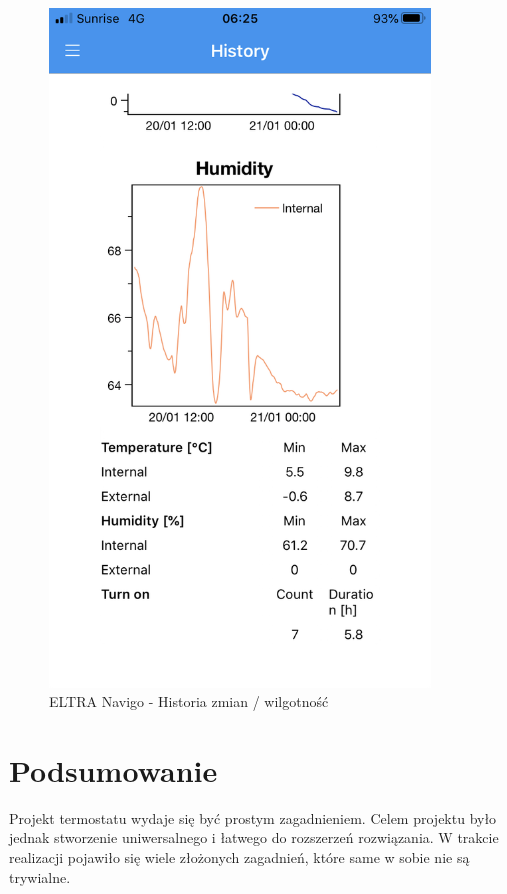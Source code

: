 \documentclass[a4paper,10pt]{article}
\begin{document}
\begin{figure}[H]
\begin{minipage}{0.45\textwidth}
        \includegraphics[width=0.9\textwidth]{navigo_history2.png} %
        \caption{ELTRA Navigo - Historia zmian / wilgotność}
        \label{rysunek_navigo_history_2}
    \end{minipage}
\end{figure}

\section{Podsumowanie}

Projekt termostatu wydaje się być prostym zagadnieniem. Celem projektu było jednak stworzenie uniwersalnego i łatwego do rozszerzeń rozwiązania. W trakcie realizacji pojawiło się wiele złożonych zagadnień, które same w sobie nie są trywialne.
\end{document}
